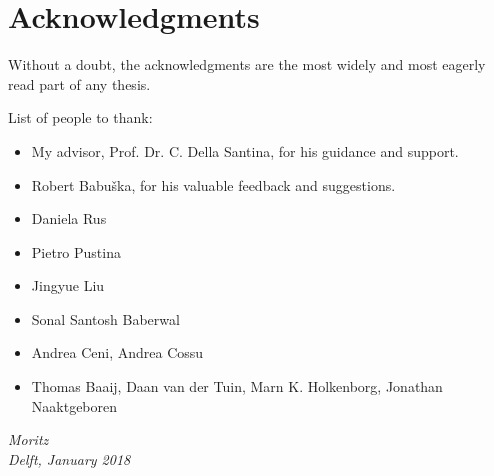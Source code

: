\chapter*{Acknowledgments}

Without a doubt, the acknowledgments are the most widely and most
eagerly read part of any thesis.

List of people to thank:
\begin{itemize}
    \item My advisor, Prof. Dr. C. Della Santina, for his guidance and support.
    \item Robert Babuška, for his valuable feedback and suggestions.
    \item Daniela Rus
    \item Pietro Pustina
    \item Jingyue Liu
    \item Sonal Santosh Baberwal
    \item Andrea Ceni, Andrea Cossu
    \item Thomas Baaij, Daan van der Tuin, Marn K. Holkenborg, Jonathan Naaktgeboren
\end{itemize}

\begin{flushright}
{\makeatletter\itshape
    Moritz \\
    Delft, January 2018
\makeatother}
\end{flushright}


